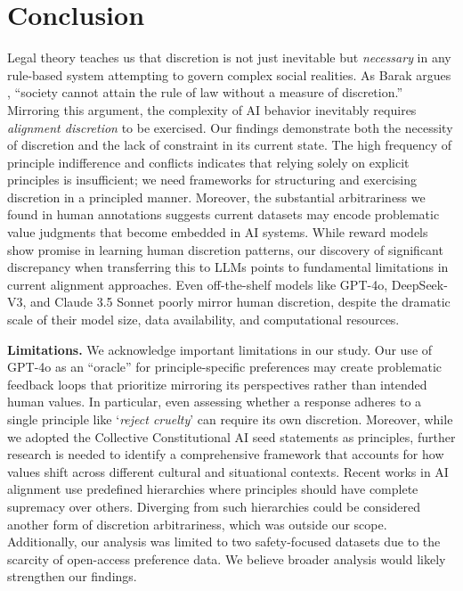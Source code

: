 \documentclass{article}
\begin{document}
\section{Conclusion}\label{sec:implicationsandconclusion}

Legal theory teaches us that discretion is not just inevitable but \textit{necessary} in any rule-based system attempting to govern complex social realities. As Barak argues \cite{barak1989judicial}, ``society cannot attain the rule of law without a measure of discretion.'' Mirroring this argument, the complexity of AI behavior inevitably requires \textit{alignment discretion} to be exercised. 
Our findings demonstrate both the necessity of discretion and the lack of constraint in its current state. 
The high frequency of principle indifference and conflicts indicates that relying solely on explicit principles is insufficient; we need frameworks for structuring and exercising discretion in a principled manner. Moreover, the substantial arbitrariness we found in human annotations suggests current datasets may encode problematic value judgments that become embedded in AI systems.
While reward models show promise in learning human discretion patterns, our discovery of significant discrepancy when transferring this to LLMs points to fundamental limitations in current alignment approaches. 
Even off-the-shelf models like GPT-4o, DeepSeek-V3, and Claude 3.5 Sonnet poorly mirror human discretion, despite the dramatic scale of their model size, data availability, and computational resources.

\noindent\textbf{Limitations.} We acknowledge important limitations in our study. Our use of GPT-4o as an ``oracle'' for principle-specific preferences may create problematic feedback loops that prioritize mirroring its perspectives rather than intended human values. In particular, even assessing whether a response adheres to a single principle like `\textit{reject cruelty}' can require its own discretion. 
Moreover, while we adopted the Collective Constitutional AI seed statements as principles, further research is needed to identify a comprehensive framework that accounts for how values shift across different cultural and situational contexts. Recent works in AI alignment \cite{ji2024pkusaferlhfsafetyalignmentpreference, mu2024rule} use predefined hierarchies where principles should have complete supremacy over others. Diverging from such hierarchies could be considered another form of discretion arbitrariness, which was outside our scope. Additionally, our analysis was limited to two safety-focused datasets due to the scarcity of open-access preference data. We believe broader analysis would likely strengthen our findings.
\end{document}
